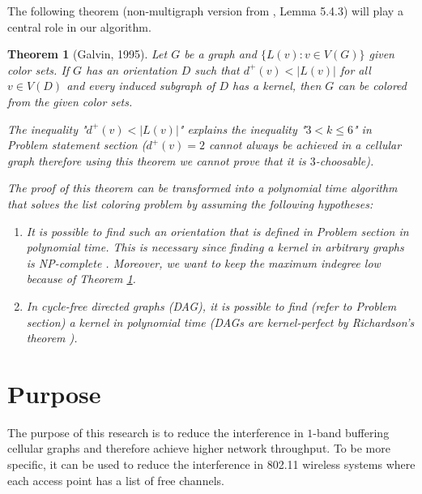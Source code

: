 \documentclass[letterpaper, 10 pt, conference]{ieeeconf}  %
\newtheorem{thm}{Theorem}
\begin{document}
The following theorem \cite{Galvin:1995:LCI:199352.199369} (non-multigraph version from \cite{citeulike:395714}, Lemma 5.4.3) will play a central role in our algorithm.

\begin{thm}[Galvin, 1995]\label{thm:galvin} Let $G$ be a graph and $\lbrace L(v) : v \in V(G) \rbrace$ given color sets. If $G$ has an orientation $D$ such that $d^+(v) < |L(v)|$ for all $v \in V(D)$ and every induced subgraph of $D$ has a kernel, then $G$ can be colored from the given color sets.

The inequality "$d^+(v) < |L(v)|$" explains the inequality "$3 < k \leqslant 6$" in Problem statement section ($d^+(v) = 2$ cannot always be achieved in a cellular graph therefore using this theorem we cannot prove that it is $3$-choosable).

The proof of this theorem can be transformed into a polynomial time algorithm that solves the list coloring problem by assuming the following hypotheses:

\begin{enumerate}
\item It is possible to find such an orientation that is defined in Problem section in polynomial time. This is necessary since finding a kernel in arbitrary graphs is NP-complete \cite{chvatal}. Moreover, we want to keep the maximum indegree low because of Theorem \ref{thm:galvin}.
\item In cycle-free directed graphs (DAG), it is possible to find (refer to Problem section) a kernel in polynomial time (DAGs are kernel-perfect by Richardson's theorem \cite{richardson1946}).
\end{enumerate}
\end{thm}

\section{Purpose}

The purpose of this research is to reduce the interference in $1$-band buffering cellular graphs and therefore achieve higher network throughput. To be more specific, it can be used to reduce the interference in 802.11 wireless systems where each access point has a list of free channels.
\end{document}
